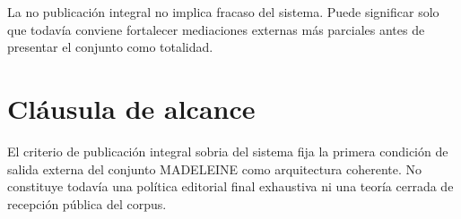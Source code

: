 \begin{observation}
La no publicación integral no implica fracaso del sistema. Puede significar solo que todavía conviene fortalecer mediaciones externas más parciales antes de presentar el conjunto como totalidad.
\end{observation}

\section{Cláusula de alcance}
\begin{observation}
El criterio de publicación integral sobria del sistema fija la primera condición de salida externa del conjunto MADELEINE como arquitectura coherente. No constituye todavía una política editorial final exhaustiva ni una teoría cerrada de recepción pública del corpus.
\end{observation}

